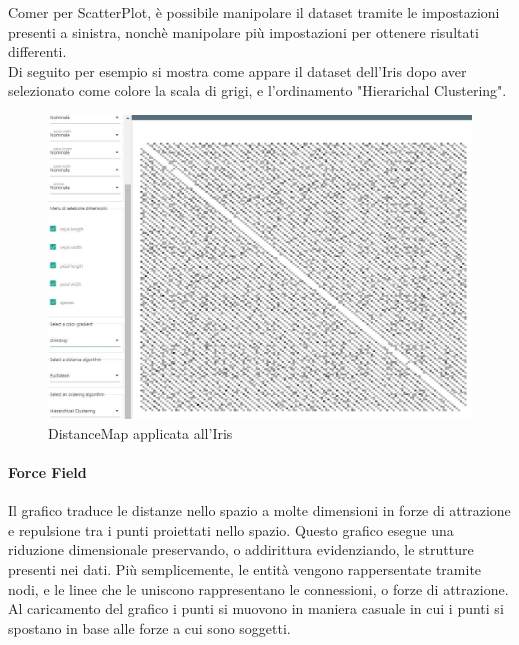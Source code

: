 \documentclass[../manuale_utente.tex]{subfiles}
\begin{document}
Comer per ScatterPlot, è possibile manipolare il dataset tramite le impostazioni presenti a sinistra, nonchè manipolare più impostazioni per ottenere risultati differenti.\\
Di seguito per esempio si mostra come appare il dataset dell'Iris dopo aver selezionato come colore la scala di grigi, e l'ordinamento "Hierarichal Clustering".


\begin{figure}[H]
	\centering
	\includegraphics[width=18cm]{src/img/dm/iris_clustering_euclideo_dm.jpg}
	\caption{DistanceMap applicata all'Iris}
\end{figure}


\paragraph{Force Field}
    \label{par:vis_force_field}
Il grafico  traduce le distanze nello spazio a molte dimensioni in forze di attrazione e repulsione tra i punti proiettati nello spazio. 
Questo grafico esegue una riduzione dimensionale preservando, o addirittura evidenziando, le strutture presenti nei dati. Più semplicemente, le entità vengono
rappersentate tramite nodi, e le linee che le uniscono rappresentano le connessioni, o forze di attrazione. Al caricamento del grafico i punti si muovono in maniera
casuale in cui i punti si spostano in base alle forze a cui sono soggetti. 
\end{document}
